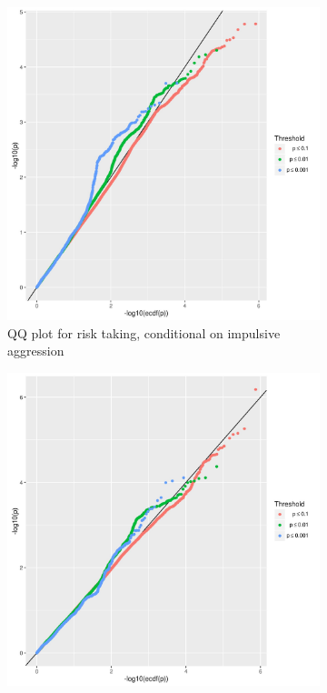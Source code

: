 \begin{figure}[!htpb]
  \centering
	\begin{subfigure}{0.4\textwidth}
		\centering
		\includegraphics[width=0.9\linewidth]{ukb_assoc/figure/cFDR/risk.jpeg}
		\caption{QQ plot for risk taking, conditional on impulsive aggression\label{fig:cFDR_risk}}
	\end{subfigure}
	\begin{subfigure}{0.4\textwidth}
		\centering
		\includegraphics[width=0.9\linewidth]{ukb_assoc/figure/cFDR/aggresion.jpeg}

\end{subfigure}
\end{figure}
